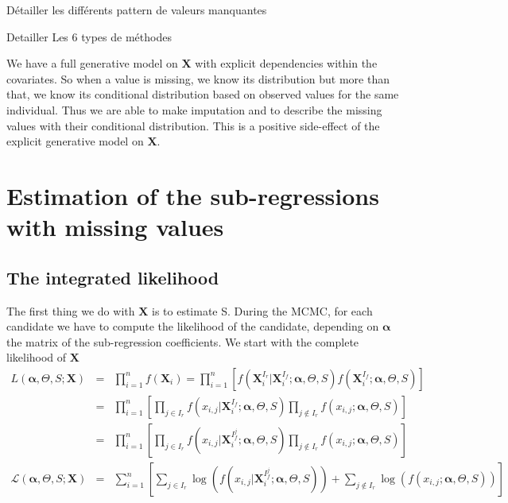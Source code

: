 \documentclass[12pt,a4paper]{report}
\begin{document}
Détailler les différents pattern de valeurs manquantes
	 
Detailler Les 6 types de méthodes	 
	 
	We have a full generative model on $\boldsymbol{X}$ with explicit dependencies within the covariates. So when a value is missing, we know its distribution but more than that, we know its conditional distribution based on observed values for the same individual. Thus we are able to make imputation and to describe the missing values with their conditional distribution. This is a positive side-effect of the explicit generative model on $\boldsymbol{X}$. 
\section{Estimation of the sub-regressions with missing values}
\subsection{The integrated likelihood}
The first thing we do with $\boldsymbol{X}$ is to estimate S.
	 During the MCMC, for each candidate we have to compute the likelihood of the candidate, depending on $\boldsymbol{\alpha}$ the matrix of the sub-regression coefficients.
We start with the complete likelihood of $\boldsymbol{X}$
\begin{eqnarray}
	L(\boldsymbol{\alpha},\Theta,S;\boldsymbol{X})&=& \prod_{i=1}^n f(\boldsymbol{X}_i)= \prod_{i=1}^n\left[f(\boldsymbol{X}_i^{I_r}|\boldsymbol{X}_i^{I_f};\boldsymbol{\alpha},\Theta,S)f(\boldsymbol{X}_i^{I_f};\boldsymbol{\alpha},\Theta,S) \right] \\
	&=&\prod_{i=1}^n\left[\prod_{j \in I_r}f(x_{i,j}|\boldsymbol{X}_i^{I_f};\boldsymbol{\alpha},\Theta,S)\prod_{j \notin I_r} f(x_{i,j};\boldsymbol{\alpha},\Theta,S) \right] \\
	&=&\prod_{i=1}^n\left[\prod_{j \in I_r}f(x_{i,j}|\boldsymbol{X}_i^{I_f^j};\boldsymbol{\alpha},\Theta,S)\prod_{j \notin I_r} f(x_{i,j};\boldsymbol{\alpha},\Theta,S) \right] \\
	\mathcal{L}(\boldsymbol{\alpha},\Theta,S;\boldsymbol{X})&=&\sum_{i=1}^n\left[\sum_{j \in I_r}\log \left(f(x_{i,j}|\boldsymbol{X}_i^{I_f^j};\boldsymbol{\alpha},\Theta,S)\right)+\sum_{j \notin I_r} \log \left(f(x_{i,j};\boldsymbol{\alpha},\Theta,S)\right) \right] \label{loglikmiss}
\end{eqnarray}
\end{document}
